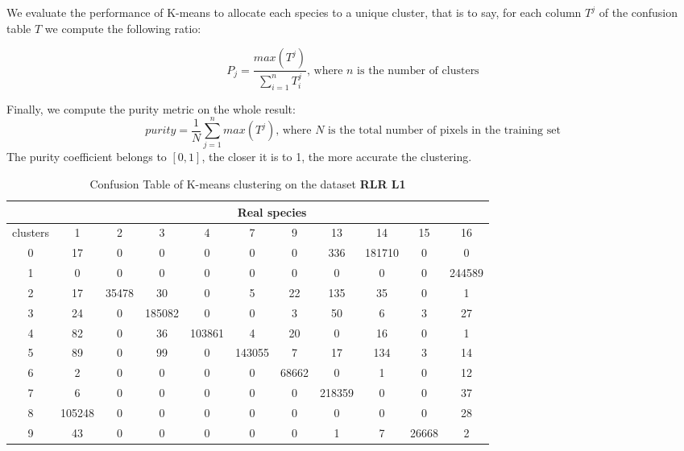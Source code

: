 \documentclass{siamart171218}
\begin{document}
We evaluate the performance of K-means to allocate each species to a unique cluster, that is to say, for each column $T^j$ of the confusion table $T$ we compute the following ratio: 

\begin{equation}
    P_j = \frac{max(T^j)}{\sum_{i=1}^{n}T^j_i} \text{, where $n$ is the number of clusters}
    \label{reussite_Kmeans}
\end{equation}
 
Finally, we compute the purity metric on the whole result: \\[-0.69cm]
\begin{equation}
    purity = \frac{1}{N}\sum_{j=1}^{n}max(T^j)
    \text{, where $N$ is the total number of pixels in the training set}
    \label{purity}
\end{equation}
The purity coefficient belongs to $[0,1]$, the closer it is to 1, the more accurate the clustering. 
\begin{table}[h!]

\centering
\caption{Confusion Table of K-means clustering on the dataset \textbf{RLR L1} } 
\begin{tabular}{|c ||c c c c c c c c c c|} 
 \hline
  & \multicolumn{10}{|c|}{Real species}\\
 \hline
  clusters & 1 & 2 & 3 & 4 & 7 & 9 & 13 & 14 & 15 & 16 \\
 \hline\hline
 0 & 17 & 0 & 0 & 0 & 0 & 0 & 336 & 181710 & 0 & 0 \\
 \hline
 1 & 0 & 0 & 0 & 0 & 0 & 0 & 0 & 0 & 0 & 244589 \\
 \hline
 2 & 17 & 35478 & 30 & 0 & 5 & 22 & 135 & 35 & 0 & 1 \\
 \hline
 3 & 24 & 0 & 185082 & 0 & 0 & 3 & 50 & 6 & 3 & 27 \\
 \hline
 4 & 82 & 0 & 36 & 103861 & 4 & 20 & 0 & 16 & 0 & 1 \\
 \hline
 5 & 89 & 0 & 99 & 0 & 143055 & 7 & 17 & 134 & 3 & 14 \\
 \hline
 6 & 2 & 0 & 0 & 0 & 0 & 68662 & 0 & 1 & 0 & 12 \\
 \hline
 7 & 6 & 0 & 0 & 0 & 0 & 0 & 218359 & 0 & 0 & 37 \\
 \hline
 8 & 105248 & 0 & 0 & 0 & 0 & 0 & 0 & 0 & 0 & 28 \\
 \hline
 9 & 43 & 0 & 0 & 0 & 0 & 0 & 1 & 7 & 26668 & 2 \\
 \hline 
\end{tabular}
\label{confusion_table_rlr1}
\end{table}
\end{document}
